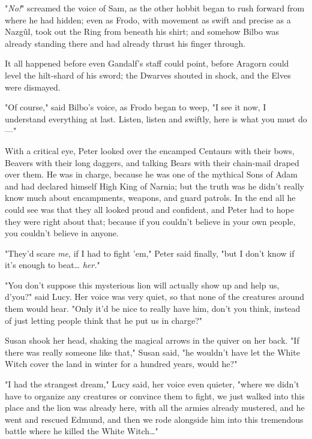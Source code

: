 "\emph{No!}" screamed the voice of Sam, as the other hobbit began to rush 
forward from where he had hidden; even as Frodo, with movement as swift and 
precise as a Nazgûl, took out the Ring from beneath his shirt; and somehow 
Bilbo was already standing there and had already thrust his finger through.

It all happened before even Gandalf's staff could point, before Aragorn could 
level the hilt-shard of his sword; the Dwarves shouted in shock, and the Elves 
were dismayed.

"Of course," said Bilbo's voice, as Frodo began to weep, "I see it now, I 
understand everything at last. Listen, listen and swiftly, here is what you 
must do---"
\sbreak

\noindent{}With a critical eye, Peter looked over the encamped Centaurs with their bows, 
Beavers with their long daggers, and talking Bears with their chain-mail draped 
over them. He was in charge, because he was one of the mythical Sons of Adam 
and had declared himself High King of Narnia; but the truth was he didn't 
really know much about encampments, weapons, and guard patrols. In the end all 
he could see was that they all looked proud and confident, and Peter had to 
hope they were right about that; because if you couldn't believe in your own 
people, you couldn't believe in anyone.

"They'd scare \emph{me}, if I had to fight 'em," Peter said finally, "but I 
don't know if it's enough to beat{\ldots} \emph{her.}"

"You don't suppose this mysterious lion will actually show up and help us, 
d'you?" said Lucy. Her voice was very quiet, so that none of the creatures 
around them would hear. "Only it'd be nice to really have him, don't you think, 
instead of just letting people think that he put us in charge?"

Susan shook her head, shaking the magical arrows in the quiver on her back. "If 
there was really someone like that," Susan said, "he wouldn't have let the 
White Witch cover the land in winter for a hundred years, would he?"

"I had the strangest dream," Lucy said, her voice even quieter, "where we 
didn't have to organize any creatures or convince them to fight, we just walked 
into this place and the lion was already here, with all the armies already 
mustered, and he went and rescued Edmund, and then we rode alongside him into 
this tremendous battle where he killed the White Witch{\ldots}"

